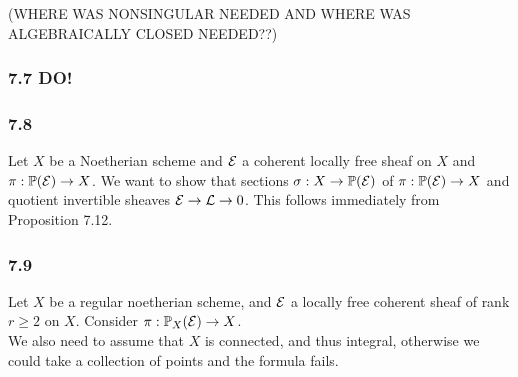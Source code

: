 \documentclass[12pt]{article}
\begin{document}
(WHERE WAS NONSINGULAR NEEDED AND WHERE WAS ALGEBRAICALLY CLOSED NEEDED??)

\subsubsection{7.7 DO!}

\subsubsection{7.8}

Let $X$ be a Noetherian scheme and $\mathcal{E}$ a coherent locally free sheaf on $X$ and $\pi : \mathbb{P}(\mathcal{E}) \to X$. We want to show that sections $\sigma : X \to \mathbb{P}(\mathcal{E})$ of $\pi : \mathbb{P}(\mathcal{E}) \to X$ and quotient invertible sheaves $\mathcal{E} \to \mathcal{L} \to 0$. This follows immediately from Proposition 7.12.

\subsubsection{7.9}

Let $X$ be a regular noetherian scheme, and $\mathcal{E}$ a locally free coherent sheaf of rank $r \ge 2$ on $X$. Consider $\pi : \mathbb{P}_X(\mathcal{E}) \to X$.
\bigskip\\
We also need to assume that $X$ is connected, and thus integral, otherwise we could take a collection of points and the formula fails. 
\end{document}
